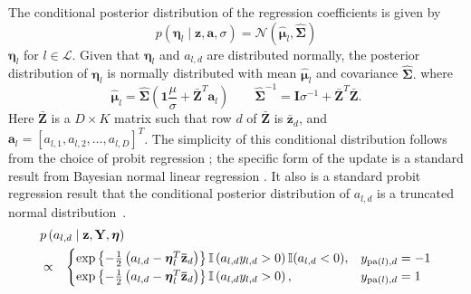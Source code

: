 The conditional posterior distribution of the regression coefficients is given by 
\begin{equation}
p(\boldsymbol\eta_{l}\mid\mathbf{z},\mathbf{a},\sigma) = \mathcal{N}(\hat{\boldsymbol\mu}_{l},\hat{\mathbf{\Sigma}})\label{eqn:regression_param_conditional}
\end{equation}
$\boldsymbol\eta_{l}$ for $l\in\mathcal{L}$. Given that $\boldsymbol\eta_{l}$
and $a_{l,d}$ are distributed normally, the posterior distribution
of $\boldsymbol\eta_{l}$ is normally distributed with mean $\hat{\boldsymbol\mu}_{l}$
and covariance $\hat{\mathbf{\Sigma}}.$%
where
\begin{equation*}
\hat{\boldsymbol\mu}_{l}  =  \hat{\mathbf{\Sigma}}\left(\mathbf{1}\frac{\mu}{\sigma}+\bar{\mathbf{Z}}^{T}\mathbf{a}_{l}\right) \qquad \hat{\mathbf{\Sigma}}^{-1}  =  \mathbf{I}\sigma^{-1}+\bar{\mathbf{Z}}^{T}\bar{\mathbf{Z}}
.\end{equation*}
Here $\bar{\mathbf{Z}}$ is a $D\times K$ matrix
such that row $d$ of $\mathbf{\bar{Z}}$ is $\bar{\mathbf{z}}_{d}$, and $\mathbf{a}_{l}=[a_{l,1},a_{l,2},\ldots,a_{l,D}]^{T}$.  The simplicity of this conditional distribution follows from the choice of probit regression  \cite{Albert_Chib_1993}; the specific form of the update is a standard result from Bayesian normal  linear regression \cite{gelmanbda04}. 
It also is a standard probit regression result that the conditional posterior
distribution of $a_{l,d}$ is a truncated normal
distribution~\cite{Albert_Chib_1993}. 
\begin{eqnarray*}
\lefteqn{p\left(a_{l,d}\mid\mathbf{z},\mathbf{Y},\mathbf{\boldsymbol\eta}\right)}\\&\propto&
\begin{cases}
\exp\left\{ -\frac{1}{2}\left(a_{l,d}-\boldsymbol\eta_{l}^{T}\mathbf{\bar{z}}_{d}\right)\right\} \mathbb{I}\left(a_{l,d}y_{l,d}>0\right)\mathbb{I}(a_{l,d}<0) , & y_{\mathrm{pa}(l),d}=-1\\
\exp\left\{ -\frac{1}{2}\left(a_{l,d}-\boldsymbol\eta_{l}^{T}\mathbf{\bar{z}}_{d}\right)\right\} \mathbb{I}\left(a_{l,d}y_{l,d}>0\right) , & y_{\mathrm{pa}(l),d}=1\end{cases}\label{eqn:a_l_d}\end{eqnarray*}

